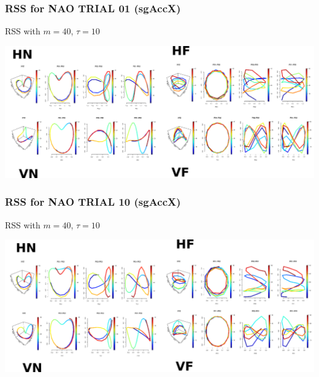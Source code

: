 \documentclass{beamer}
\begin{document}
\begin{frame}
\frametitle{RSS for NAO TRIAL 01 (sgAccX)}

RSS with $m=40$, $\tau=10$
\begin{adjustwidth}{-3em}{-3em}
\includegraphics[width=1.2\textwidth]{Robot_p01rss}
\end{adjustwidth}

\end{frame}


\begin{frame}
\frametitle{RSS for NAO TRIAL 10 (sgAccX)}

RSS with $m=40$, $\tau=10$
\begin{adjustwidth}{-3em}{-3em}
\includegraphics[width=1.2\textwidth]{Robot_p10rss}
\end{adjustwidth}

\end{frame}
\end{document}

